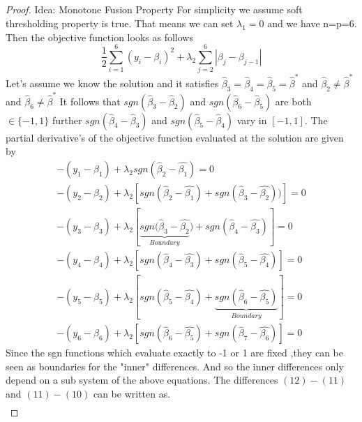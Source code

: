 \documentclass{article}
\theoremstyle{definition}
\begin{document}
\subsection{}
\begin{proof} Idea: Monotone Fusion Property \citep{friedman2007pathwise}
For simplicity we assume soft thresholding property is true. That means we can set $\lambda_1=0$ and we have n=p=6. Then the objective function looks as follows
\begin{equation}
\frac{1}{2}  \sum_{i=1}^{6}(y_{i}-\beta_i)^2+ \lambda_2 \sum_{j=2}^6|\beta_j- \beta_{j-1} |
\end{equation}
Let's assume we know the solution and it satisfies $\hat{\beta}_3=\hat{\beta}_4=\hat{\beta}_5=\hat{\beta}^*$ and $\hat{\beta}_2\neq\hat{\beta}^*$ and $\hat{\beta}_6\neq\hat{\beta}^*$ It follows that $sgn(\hat{\beta}_3-\hat{\beta}_2)$ and $sgn(\hat{\beta}_6-\hat{\beta}_5)$ are both $\in \{-1,1\}$ further $sgn(\hat{\beta}_4-\hat{\beta}_3)$ and $sgn(\hat{\beta}_5-\hat{\beta}_4)$ vary in $[-1,1]$. The partial derivative's of the objective function evaluated at the solution are given by
\begin{align}
-(y_1-\hat{\beta}_1)+\lambda_2 sgn(\hat{\beta}_2-\hat{\beta_1})=0 \\
-(y_2-\hat{\beta}_2)+\lambda_2 [sgn(\hat{\beta}_2-\hat{\beta_1})+sgn(\hat{\beta}_3-\hat{\beta_2}))]=0 \\
-(y_3-\hat{\beta}_3)+\lambda_2 [\underbrace{sgn(\hat{\beta}_3-\hat{\beta_2}}_{Boundary})+sgn(\hat{\beta}_4-\hat{\beta_3})]=0 \\
-(y_4-\hat{\beta}_4)+\lambda_2 [sgn(\hat{\beta}_4-\hat{\beta_3})+sgn(\hat{\beta}_5-\hat{\beta_4})]=0 \\
-(y_5-\hat{\beta}_5)+\lambda_2 [sgn(\hat{\beta}_5-\hat{\beta_4})+\underbrace{sgn(\hat{\beta}_6-\hat{\beta_5})}_{Boundary}]=0 \\
-(y_6-\hat{\beta}_6)+\lambda_2 [sgn(\hat{\beta}_6-\hat{\beta_5})+sgn(\hat{\beta}_7-\hat{\beta_6})]=0 
\end{align}
Since the sgn functions which evaluate exactly to -1 or 1 are fixed ,they can be seen as boundaries for the "inner" differences. And so the inner differences only depend on  a sub system of the above equations. The differences $(12)-(11)$ and $(11)-(10)$ can be written as. 
\begin{align}

\end{align}
\end{proof}
\end{document}
